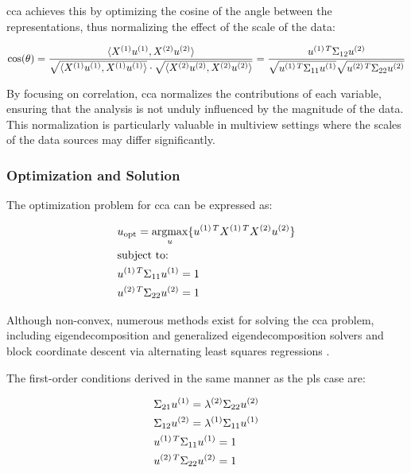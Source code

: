 \acrshort{cca} achieves this by optimizing the cosine of the angle between the representations, thus normalizing the effect of the scale of the data:

\begin{align}
    \label{eq:cosine-similarity}
    \cos(\theta) = \frac{\langle X^{(1)}u^{(1)}, X^{(2)}u^{(2)}\rangle}{\sqrt{\langle X^{(1)}u^{(1)}, X^{(1)}u^{(1)}\rangle}\cdot \sqrt{\langle X^{(2)}u^{(2)}, X^{(2)}u^{(2)}\rangle}}= \frac{u^{(1)\,T}\Sigma_{12}u^{(2)}}{\sqrt{u^{(1)\,T}\Sigma_{11}u^{(1)}} \sqrt{u^{(2)\,T}\Sigma_{22}u^{(2)}}}
\end{align}

By focusing on correlation, \acrshort{cca} normalizes the contributions of each variable, ensuring that the analysis is not unduly influenced by the magnitude of the data. This normalization is particularly valuable in multiview settings where the scales of the data sources may differ significantly.

\subsubsection{Optimization and Solution}
The optimization problem for \acrshort{cca} can be expressed as:

\begin{align}
    & u_{\text{opt}}=\underset{u}{\mathrm{argmax}}\{ u^{(1)\,T}X^{(1)\,T}X^{(2)}u^{(2)} \} \\
    & \text{subject to:} \notag                                                                \\
    & u^{(1)\,T}\Sigma_{11}u^{(1)}=1 \notag                                                  \\
    & u^{(2)\,T}\Sigma_{22}u^{(2)}=1 \notag
\end{align}

Although non-convex, numerous methods exist for solving the \acrshort{cca} problem, including eigendecomposition and generalized eigendecomposition solvers \citep{uurtio2017tutorial} and block coordinate descent via alternating least squares regressions \citep{golub1995canonical,sun2008least}.

The first-order conditions derived in the same manner as the \acrshort{pls} case are:

\begin{align}
    \label{CCA:FOCs}
    & \Sigma_{21}u^{(1)}=\lambda^{(2)} \Sigma_{22}u^{(2)} \\
    & \Sigma_{12}u^{(2)}=\lambda^{(1)} \Sigma_{11}u^{(1)} \\
    & u^{(1)\,T}\Sigma_{11}u^{(1)}=1                       \\
    & u^{(2)\,T}\Sigma_{22}u^{(2)}=1
\end{align}

